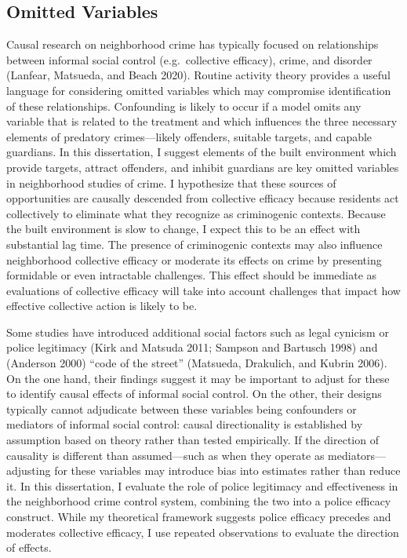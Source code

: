 \documentclass [11pt, proquest] {uwthesis}[2015/03/03]
\begin{document}
\hypertarget{omitted-variables}{%
\subsection{Omitted Variables}\label{omitted-variables}}

Causal research on neighborhood crime has typically focused on relationships between informal social control (e.g.~collective efficacy), crime, and disorder (Lanfear, Matsueda, and Beach 2020). Routine activity theory provides a useful language for considering omitted variables which may compromise identification of these relationships. Confounding is likely to occur if a model omits any variable that is related to the treatment and which influences the three necessary elements of predatory crimes---likely offenders, suitable targets, and capable guardians. In this dissertation, I suggest elements of the built environment which provide targets, attract offenders, and inhibit guardians are key omitted variables in neighborhood studies of crime. I hypothesize that these sources of opportunities are causally descended from collective efficacy because residents act collectively to eliminate what they recognize as criminogenic contexts. Because the built environment is slow to change, I expect this to be an effect with substantial lag time. The presence of criminogenic contexts may also influence neighborhood collective efficacy or moderate its effects on crime by presenting formidable or even intractable challenges. This effect should be immediate as evaluations of collective efficacy will take into account challenges that impact how effective collective action is likely to be.

Some studies have introduced additional social factors such as legal cynicism or police legitimacy (Kirk and Matsuda 2011; Sampson and Bartusch 1998) and (Anderson 2000) ``code of the street'' (Matsueda, Drakulich, and Kubrin 2006). On the one hand, their findings suggest it may be important to adjust for these to identify causal effects of informal social control. On the other, their designs typically cannot adjudicate between these variables being confounders or mediators of informal social control: causal directionality is established by assumption based on theory rather than tested empirically. If the direction of causality is different than assumed---such as when they operate as mediators---adjusting for these variables may introduce bias into estimates rather than reduce it. In this dissertation, I evaluate the role of police legitimacy and effectiveness in the neighborhood crime control system, combining the two into a police efficacy construct. While my theoretical framework suggests police efficacy precedes and moderates collective efficacy, I use repeated observations to evaluate the direction of effects.
\end{document}
